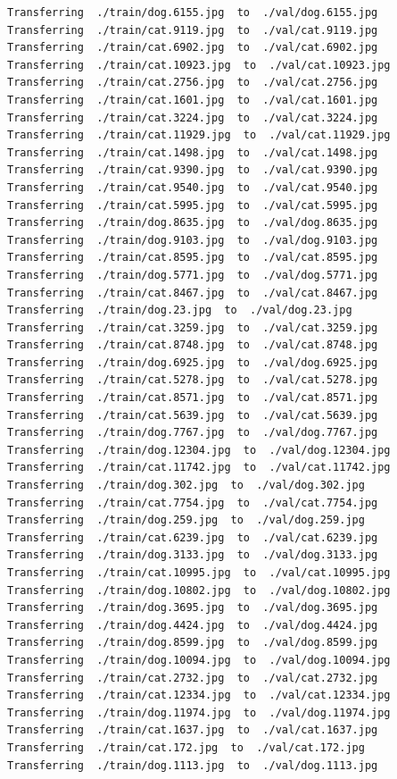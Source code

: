 \documentclass[]{book}
\theoremstyle{definition}
\theoremstyle{definition}
\theoremstyle{definition}
\theoremstyle{remark}
\begin{document}
\begin{verbatim}
Transferring  ./train/dog.6155.jpg  to  ./val/dog.6155.jpg
Transferring  ./train/cat.9119.jpg  to  ./val/cat.9119.jpg
Transferring  ./train/cat.6902.jpg  to  ./val/cat.6902.jpg
Transferring  ./train/cat.10923.jpg  to  ./val/cat.10923.jpg
Transferring  ./train/cat.2756.jpg  to  ./val/cat.2756.jpg
Transferring  ./train/cat.1601.jpg  to  ./val/cat.1601.jpg
Transferring  ./train/cat.3224.jpg  to  ./val/cat.3224.jpg
Transferring  ./train/cat.11929.jpg  to  ./val/cat.11929.jpg
Transferring  ./train/cat.1498.jpg  to  ./val/cat.1498.jpg
Transferring  ./train/cat.9390.jpg  to  ./val/cat.9390.jpg
Transferring  ./train/cat.9540.jpg  to  ./val/cat.9540.jpg
Transferring  ./train/cat.5995.jpg  to  ./val/cat.5995.jpg
Transferring  ./train/dog.8635.jpg  to  ./val/dog.8635.jpg
Transferring  ./train/dog.9103.jpg  to  ./val/dog.9103.jpg
Transferring  ./train/cat.8595.jpg  to  ./val/cat.8595.jpg
Transferring  ./train/dog.5771.jpg  to  ./val/dog.5771.jpg
Transferring  ./train/cat.8467.jpg  to  ./val/cat.8467.jpg
Transferring  ./train/dog.23.jpg  to  ./val/dog.23.jpg
Transferring  ./train/cat.3259.jpg  to  ./val/cat.3259.jpg
Transferring  ./train/cat.8748.jpg  to  ./val/cat.8748.jpg
Transferring  ./train/dog.6925.jpg  to  ./val/dog.6925.jpg
Transferring  ./train/cat.5278.jpg  to  ./val/cat.5278.jpg
Transferring  ./train/cat.8571.jpg  to  ./val/cat.8571.jpg
Transferring  ./train/cat.5639.jpg  to  ./val/cat.5639.jpg
Transferring  ./train/dog.7767.jpg  to  ./val/dog.7767.jpg
Transferring  ./train/dog.12304.jpg  to  ./val/dog.12304.jpg
Transferring  ./train/cat.11742.jpg  to  ./val/cat.11742.jpg
Transferring  ./train/dog.302.jpg  to  ./val/dog.302.jpg
Transferring  ./train/cat.7754.jpg  to  ./val/cat.7754.jpg
Transferring  ./train/dog.259.jpg  to  ./val/dog.259.jpg
Transferring  ./train/cat.6239.jpg  to  ./val/cat.6239.jpg
Transferring  ./train/dog.3133.jpg  to  ./val/dog.3133.jpg
Transferring  ./train/cat.10995.jpg  to  ./val/cat.10995.jpg
Transferring  ./train/dog.10802.jpg  to  ./val/dog.10802.jpg
Transferring  ./train/dog.3695.jpg  to  ./val/dog.3695.jpg
Transferring  ./train/dog.4424.jpg  to  ./val/dog.4424.jpg
Transferring  ./train/dog.8599.jpg  to  ./val/dog.8599.jpg
Transferring  ./train/dog.10094.jpg  to  ./val/dog.10094.jpg
Transferring  ./train/cat.2732.jpg  to  ./val/cat.2732.jpg
Transferring  ./train/cat.12334.jpg  to  ./val/cat.12334.jpg
Transferring  ./train/dog.11974.jpg  to  ./val/dog.11974.jpg
Transferring  ./train/cat.1637.jpg  to  ./val/cat.1637.jpg
Transferring  ./train/cat.172.jpg  to  ./val/cat.172.jpg
Transferring  ./train/dog.1113.jpg  to  ./val/dog.1113.jpg

\end{verbatim}
\end{document}
